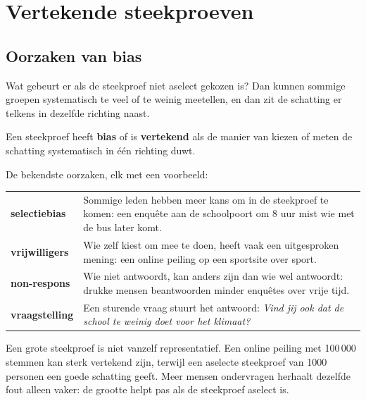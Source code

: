 \begin{oefeningen}
\end{oefeningen}

\section{Vertekende steekproeven}

\subsection{Oorzaken van bias}

Wat gebeurt er als de steekproef niet aselect gekozen is? Dan kunnen sommige groepen systematisch te veel of te weinig meetellen, en dan zit de schatting er telkens in dezelfde richting naast.

\begin{theorie}
Een steekproef heeft \textbf{\textcolor{accent}{bias}} of is \textbf{\textcolor{accent}{vertekend}} als de manier van kiezen of meten de schatting systematisch in één richting duwt.
\end{theorie}

De bekendste oorzaken, elk met een voorbeeld:

{\renewcommand{\arraystretch}{1.4}%
\begin{tabular}{@{}>{\RaggedRight\arraybackslash\bfseries}p{3.6cm}>{\RaggedRight\arraybackslash}p{12cm}@{}}
selectiebias & Sommige leden hebben meer kans om in de steekproef te komen: een enquête aan de schoolpoort om 8 uur mist wie met de bus later komt. \\
vrijwilligers & Wie zelf kiest om mee te doen, heeft vaak een uitgesproken mening: een online peiling op een sportsite over sport. \\
non-respons & Wie niet antwoordt, kan anders zijn dan wie wel antwoordt: drukke mensen beantwoorden minder enquêtes over vrije tijd. \\
vraagstelling & Een sturende vraag stuurt het antwoord: \textit{Vind jij ook dat de school te weinig doet voor het klimaat?}
\end{tabular}\par}

Een grote steekproef is niet vanzelf representatief. Een online peiling met 100\,000 stemmen kan sterk vertekend zijn, terwijl een aselecte steekproef van 1000 personen een goede schatting geeft. Meer mensen ondervragen herhaalt dezelfde fout alleen vaker: de grootte helpt pas als de steekproef aselect is.

